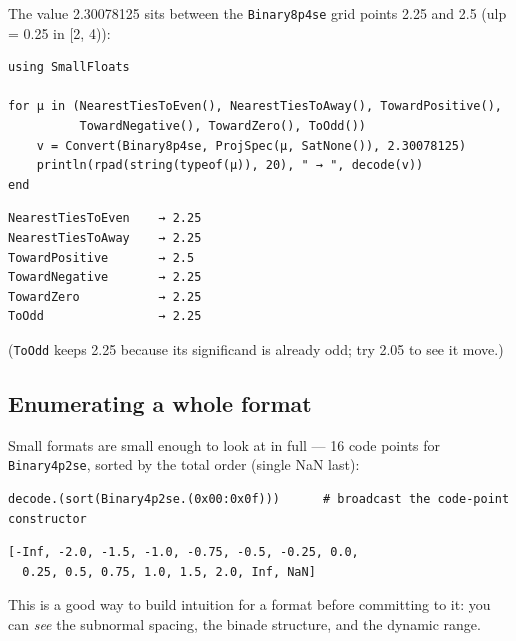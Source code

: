 \label{14660386703135810651}{}


The value 2.30078125 sits between the \texttt{Binary8p4se} grid points 2.25 and 2.5 (ulp = 0.25 in [2, 4)):




\begin{verbatim}
using SmallFloats

for μ in (NearestTiesToEven(), NearestTiesToAway(), TowardPositive(),
          TowardNegative(), TowardZero(), ToOdd())
    v = Convert(Binary8p4se, ProjSpec(μ, SatNone()), 2.30078125)
    println(rpad(string(typeof(μ)), 20), " → ", decode(v))
end
\end{verbatim}




\begin{verbatim}
NearestTiesToEven    → 2.25
NearestTiesToAway    → 2.25
TowardPositive       → 2.5
TowardNegative       → 2.25
TowardZero           → 2.25
ToOdd                → 2.25
\end{verbatim}



(\texttt{ToOdd} keeps 2.25 because its significand is already odd; try 2.05 to see it move.)



\subsection{Enumerating a whole format}



\label{15296297375297823522}{}


Small formats are small enough to look at in full — 16 code points for \texttt{Binary4p2se}, sorted by the total order (single NaN last):




\begin{verbatim}
decode.(sort(Binary4p2se.(0x00:0x0f)))      # broadcast the code-point constructor
\end{verbatim}




\begin{verbatim}
[-Inf, -2.0, -1.5, -1.0, -0.75, -0.5, -0.25, 0.0,
  0.25, 0.5, 0.75, 1.0, 1.5, 2.0, Inf, NaN]
\end{verbatim}



This is a good way to build intuition for a format before committing to it: you can \emph{see} the subnormal spacing, the binade structure, and the dynamic range.



